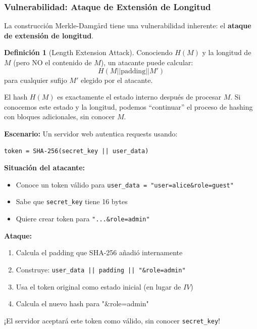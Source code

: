 \documentclass[11pt,a4paper,twoside,openright]{book}
\theoremstyle{definition}
\newtheorem{definition}{Definición}[chapter]
\theoremstyle{plain}
\theoremstyle{remark}
\begin{document}
\subsubsection{Vulnerabilidad: Ataque de Extensión de Longitud}

\begin{advertencia}
La construcción Merkle-Damgård tiene una vulnerabilidad inherente: el \textbf{ataque de extensión de longitud}.
\end{advertencia}

\begin{definition}[Length Extension Attack]
Conociendo $H(M)$ y la longitud de $M$ (pero NO el contenido de $M$), un atacante puede calcular:
\[ H(M || \text{padding} || M') \]
para cualquier sufijo $M'$ elegido por el atacante.
\end{definition}

\begin{intuicion}
El hash $H(M)$ es exactamente el estado interno después de procesar $M$. Si conocemos este estado y la longitud, podemos ``continuar'' el proceso de hashing con bloques adicionales, sin conocer $M$.
\end{intuicion}

\begin{ejemplo}
\textbf{Escenario:} Un servidor web autentica requests usando:
\begin{verbatim}
token = SHA-256(secret_key || user_data)
\end{verbatim}

\textbf{Situación del atacante:}
\begin{itemize}
    \item Conoce un token válido para \texttt{user\_data = "user=alice\&role=guest"}
    \item Sabe que \texttt{secret\_key} tiene 16 bytes
    \item Quiere crear token para \texttt{"...\&role=admin"}
\end{itemize}

\textbf{Ataque:}
\begin{enumerate}
    \item Calcula el padding que SHA-256 añadió internamente
    \item Construye: \texttt{user\_data || padding || "\&role=admin"}
    \item Usa el token original como estado inicial (en lugar de $IV$)
    \item Calcula el nuevo hash para "\&role=admin"
\end{enumerate}

¡El servidor aceptará este token como válido, sin conocer \texttt{secret\_key}!
\end{ejemplo}
\end{document}
